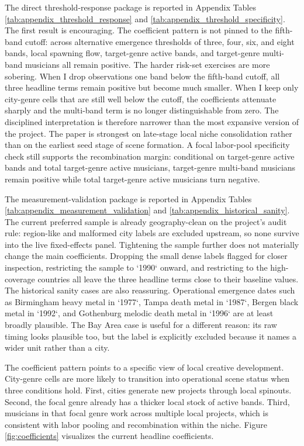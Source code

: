 The direct threshold-response package is reported in Appendix Tables
\ref{tab:appendix_threshold_response} and \ref{tab:appendix_threshold_specificity}. The first
result is encouraging. The coefficient pattern is not pinned to the fifth-band cutoff: across
alternative emergence thresholds of three, four, six, and eight bands, local spawning flow,
target-genre active bands, and target-genre multi-band musicians all remain positive. The harder
risk-set exercises are more sobering. When I drop observations one band below the fifth-band
cutoff, all three headline terms remain positive but become much smaller. When I keep only
city-genre cells that are still well below the cutoff, the coefficients attenuate sharply and the
multi-band term is no longer distinguishable from zero. The disciplined interpretation is
therefore narrower than the most expansive version of the project. The paper is strongest on
late-stage local niche consolidation rather than on the earliest seed stage of scene formation.
A focal labor-pool specificity check still supports the recombination margin: conditional on
target-genre active bands and total target-genre active musicians, target-genre multi-band
musicians remain positive while total target-genre active musicians turn negative.

The measurement-validation package is reported in Appendix Tables
\ref{tab:appendix_measurement_validation} and \ref{tab:appendix_historical_sanity}. The current
preferred sample is already geography-clean on the project's audit rule: region-like and malformed
city labels are excluded upstream, so none survive into the live fixed-effects panel. Tightening
the sample further does not materially change the main coefficients. Dropping the small dense
labels flagged for closer inspection, restricting the sample to `1990` onward, and restricting to
the high-coverage countries all leave the three headline terms close to their baseline values.
The historical sanity cases are also reassuring. Operational emergence dates such as Birmingham
heavy metal in `1977`, Tampa death metal in `1987`, Bergen black metal in `1992`, and Gothenburg
melodic death metal in `1996` are at least broadly plausible. The Bay Area case is useful for a
different reason: its raw timing looks plausible too, but the label is explicitly excluded because
it names a wider unit rather than a city.

The coefficient pattern points to a specific view of local creative development. City-genre cells
are more likely to transition into operational scene status when three conditions hold. First,
cities generate new projects through local spinouts. Second, the focal genre already has a thicker
local stock of active bands. Third, musicians in that focal genre work across multiple local
projects, which is consistent with labor pooling and recombination within the niche.
Figure \ref{fig:coefficients} visualizes the current headline coefficients.

